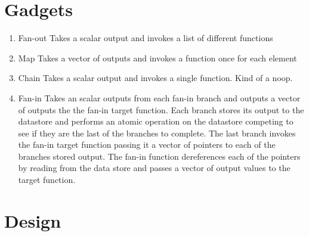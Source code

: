 \section{Gadgets}\label{sec:gadgets}


\begin{enumerate}
  \item Fan-out
        Takes a scalar output and invokes a list of different functions
  \item Map
        Takes a vector of outputs and invokes a function once for each element
  \item Chain
        Takes a scalar output and invokes a single function. Kind of a noop.
  \item Fan-in
        Takes an scalar outputs from each fan-in branch and outputs a vector of
        outputs the the fan-in target function. Each branch stores its output to the
        datastore and performs an atomic operation on the datastore competing to see if
        they are the last of the branches to complete. The last branch invokes the
        fan-in target function passing it a vector of pointers to each of the branches
        stored output. The fan-in function dereferences each of the pointers by reading
        from the data store and passes a vector of output values to the target function.
\end{enumerate}

\section{Design}\label{sec:design}

